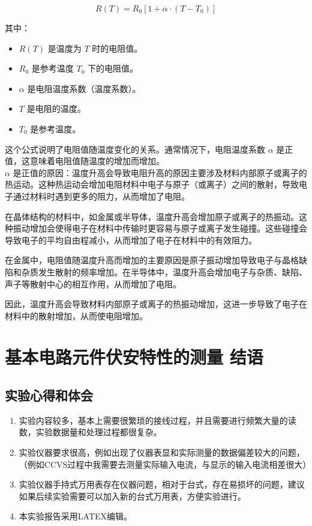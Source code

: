 \documentclass[dvipsnames, svgnames,a4paper,11pt]{article}
\begin{document}
\[ R(T) = R_0 \left[1 + \alpha \cdot (T - T_0)\right] \]

其中：
\begin{itemize}
    \item \( R(T) \) 是温度为 \( T \) 时的电阻值。
    \item \( R_0 \) 是参考温度 \( T_0 \) 下的电阻值。
    \item \( \alpha \) 是电阻温度系数（温度系数）。
    \item \( T \) 是电阻的温度。
    \item \( T_0 \) 是参考温度。
\end{itemize}

这个公式说明了电阻值随温度变化的关系。通常情况下，电阻温度系数 \( \alpha \) 是正值，这意味着电阻值随温度的增加而增加。\\
\( \alpha \) 是正值的原因：温度升高会导致电阻升高的原因主要涉及材料内部原子或离子的热运动。这种热运动会增加电阻材料中电子与原子（或离子）之间的散射，导致电子通过材料时遇到更多的阻力，从而增加了电阻。

在晶体结构的材料中，如金属或半导体，温度升高会增加原子或离子的热振动。这种振动增加会使得电子在材料中传输时更容易与原子或离子发生碰撞。这些碰撞会导致电子的平均自由程减小，从而增加了电子在材料中的有效阻力。

在金属中，电阻值随温度升高而增加的主要原因是原子振动增加导致电子与晶格缺陷和杂质发生散射的频率增加。在半导体中，温度升高会增加电子与杂质、缺陷、声子等散射中心的相互作用，从而增加了电阻。

因此，温度升高会导致材料内部原子或离子的热振动增加，这进一步导致了电子在材料中的散射增加，从而使电阻增加。
	
	
	\clearpage
	
	\section{基本电路元件伏安特性的测量 \quad\heiti 结语}
	
	\subsection{实验心得和体会}
	\begin{enumerate}
		\item 实验内容较多，基本上需要很繁琐的接线过程，并且需要进行频繁大量的读数，实验数据量和处理过程都很复杂。
		\item 实验仪器要求很高，例如出现了仪器表显和实际测量的数据偏差较大的问题，（例如CCVS过程中我需要去测量实际输入电流，与显示的输入电流相差很大）
		\item 实验仪器手持式万用表存在仪器问题，相对于台式，存在易损坏的问题，建议如果后续实验需要可以加入新的台式万用表，方便实验进行。
		\item 本实验报告采用LATEX编辑。
	\end{enumerate}
	
\end{document}
